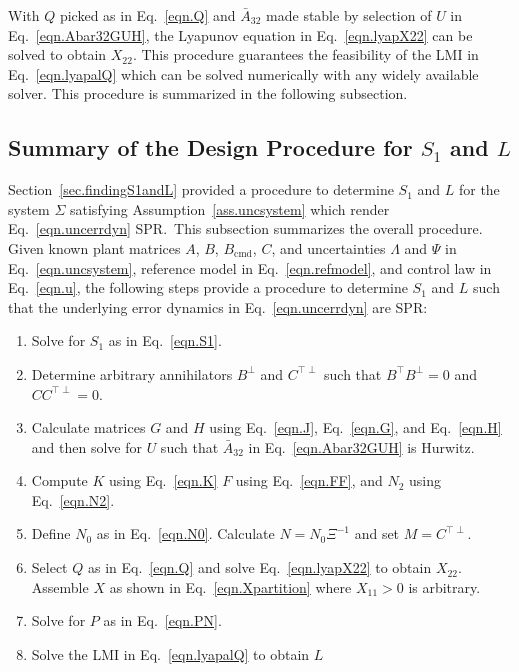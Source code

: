 \documentclass[]{../sty/JGCD}
\theoremstyle{examplestyle}
\begin{document}
  With $Q$ picked as in Eq.\ \eqref{eqn.Q} and $\bar{A}_{32}$ made stable by selection of $U$ in Eq.\ \eqref{eqn.Abar32GUH}, the Lyapunov equation in Eq.\ \eqref{eqn.lyapX22} can be solved to obtain $X_{22}$.
  This procedure guarantees the feasibility of the LMI in Eq.\ \eqref{eqn.lyapalQ} which can be solved numerically with any widely available solver.
  This procedure is summarized in the following subsection.

  \subsection{Summary of the Design Procedure for $S_{1}$ and $L$}\label{sec.designprocedure}

  Section~\ref{sec.findingS1andL} provided a procedure to determine $S_{1}$ and $L$ for the system $\Sigma$ satisfying Assumption~\ref{ass.uncsystem} which render Eq.\ \eqref{eqn.uncerrdyn} SPR.\
  This subsection summarizes the overall procedure.
  Given known plant matrices $A$, $B$, $B_{\text{cmd}}$, $C$, and uncertainties $\Lambda$ and $\Psi$ in Eq.\ \eqref{eqn.uncsystem}, reference model in Eq.\ \eqref{eqn.refmodel}, and control law in Eq.\ \eqref{eqn.u}, the following steps provide a procedure to determine $S_{1}$ and $L$ such that the underlying error dynamics in Eq.\ \eqref{eqn.uncerrdyn} are SPR:\@

  \begin{enumerate}
    \setlength{\itemsep}{0pt}
    \item{Solve for $S_{1}$ as in Eq.\ \eqref{eqn.S1}.}
    \item{Determine arbitrary annihilators $B^{\perp}$ and $C^{\top\perp}$ such that $B^{\top}B^{\perp}=0$ and $CC^{\top\perp}=0$.}
    \item{\label{step.U}Calculate matrices $G$ and $H$ using Eq.\ \eqref{eqn.J}, Eq.\ \eqref{eqn.G}, and Eq.\ \eqref{eqn.H} and then solve for $U$ such that $\bar{A}_{32}$ in Eq.\ \eqref{eqn.Abar32GUH} is Hurwitz.}
    \item{Compute $K$ using Eq.\ \eqref{eqn.K} $F$ using Eq.\ \eqref{eqn.FF}, and $N_{2}$ using Eq.\ \eqref{eqn.N2}.}
    \item{Define $N_{0}$ as in Eq.\ \eqref{eqn.N0}. Calculate $N=N_{0}\Xi^{-1}$ and set $M=C^{\top\perp}$.}
    \item{\label{step.X11}Select $Q$ as in Eq.\ \eqref{eqn.Q} and solve Eq.\ \eqref{eqn.lyapX22} to obtain $X_{22}$. Assemble $X$ as shown in Eq.\ \eqref{eqn.Xpartition} where $X_{11}>0$ is arbitrary.}
    \item{Solve for $P$ as in Eq.\ \eqref{eqn.PN}.}
    \item{Solve the LMI in Eq.\ \eqref{eqn.lyapalQ} to obtain $L$}
  \end{enumerate}
\end{document}
